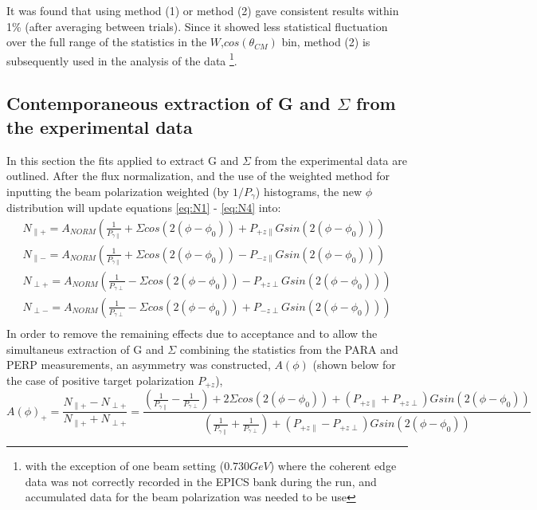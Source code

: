 It was found that using method (1) or method (2) gave consistent results within 1\% (after averaging between trials). Since it showed less statistical fluctuation over the full range of the statistics in the $W$,$cos(\theta_{CM})$ bin, method (2) is subsequently used in the analysis of the data \footnote{with the exception of one beam setting ($0.730 GeV$) where the coherent edge data was not correctly recorded in the EPICS bank during the run, and accumulated data for the beam polarization was needed to be use}.



\subsection{Contemporaneous extraction of G and \texorpdfstring{$\Sigma$}{Sigma} from the experimental data} \label{ch:extract_G_S}
In this section the fits applied to extract G and $\Sigma$ from the experimental data are outlined.  After the flux normalization, and the use of the weighted method for inputting the beam polarization weighted (by $1/P_{\gamma}$) histograms, the new $\phi$ distribution will update equations \ref{eq:N1} - \ref{eq:N4} into:
\begin{eqnarray}
N_{\parallel +} = A_{NORM} \left( \frac{1}{P_{\gamma \parallel}} + \Sigma cos(2(\phi-\phi_0)) +  P_{+z\parallel} G sin(2(\phi-\phi_0)) \right) \label{eq:UN1}\\
N_{\parallel -} = A_{NORM} \left(\frac{1}{P_{\gamma \parallel}} + \Sigma cos(2(\phi-\phi_0)) - P_{-z\parallel} G sin(2(\phi-\phi_0)) \right) \label{eq:UN2}\\
N_{\perp +} = A_{NORM} \left( \frac{1}{P_{\gamma \perp}} - \Sigma cos(2(\phi-\phi_0)) -  P_{+z\perp} G sin(2(\phi-\phi_0)) \right) \label{eq:UN3}\\
N_{\perp -} = A_{NORM} \left( \frac{1}{P_{\gamma \perp}} - \Sigma cos(2(\phi-\phi_0)) +  P_{-z\perp} G sin(2(\phi-\phi_0)) \right) \label{eq:UN4}\\
\end{eqnarray}
In order to remove the remaining effects due to acceptance and to allow the simultaneus extraction of G and $\Sigma$ combining the statistics from the PARA and PERP measurements, an asymmetry was constructed, $A(\phi)$ (shown below for the case of positive target polarization $P_{+z}$),
\begin{equation}
  A(\phi)_+ = \frac{N_{\parallel +} - N_{\perp +}}{N_{\parallel +} + N_{\perp +}} = \frac{ (\frac{1}{P_{\gamma \parallel}} - \frac{1}{P_{\gamma \perp}}) + 2 \Sigma cos(2(\phi-\phi_0)) +  (P_{+z\parallel}+P_{+z\perp}) G sin(2(\phi-\phi_0))}{(\frac{1}{P_{\gamma \parallel}} + \frac{1}{P_{\gamma \perp}}) +(P_{+z\parallel}-P_{+z\perp}) G sin(2(\phi-\phi_0))} \label{eq:A1}
\end{equation}
